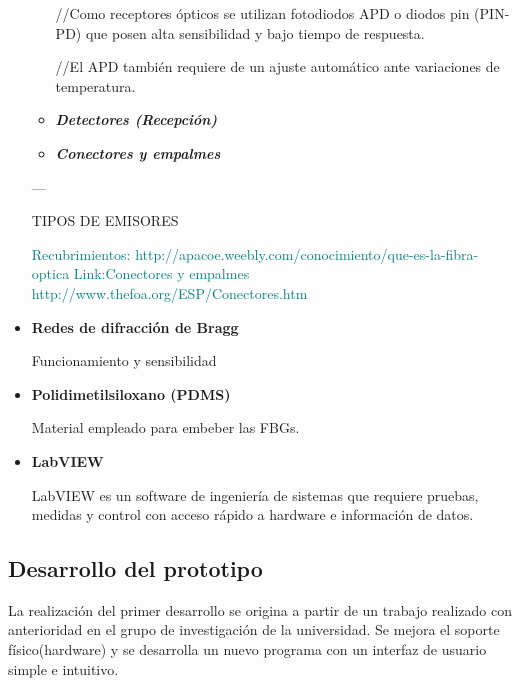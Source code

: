 \begin{itemize}
\begin{itemize}
 		//Como receptores ópticos se utilizan fotodiodos APD o diodos pin (PIN-PD) que posen alta sensibilidad y bajo tiempo de respuesta.
 		
 		//El APD también requiere de un ajuste automático ante variaciones de temperatura.
 		
 		
 		
 		\item \textit{\textbf{Detectores (Recepción)}}
 			
 			
 		\item \textit{\textbf{Conectores y empalmes}}
 		
 	 \end{itemize}					


---

TIPOS DE EMISORES


					


\textcolor{teal}{
	Recubrimientos: http://apacoe.weebly.com/conocimiento/que-es-la-fibra-optica
	Link:Conectores y empalmes
	http://www.thefoa.org/ESP/Conectores.htm
}

	\item \textbf{Redes de difracción de Bragg}
		
	Funcionamiento y sensibilidad
	
	\item \textbf{Polidimetilsiloxano (PDMS)}
		
	Material empleado para embeber las FBGs.
	
	\item \textbf{LabVIEW}
		
	LabVIEW es un software de ingeniería de sistemas que requiere pruebas, medidas y control con acceso rápido a hardware e información de datos. \cite{LabVIEWpage}





\end{itemize}
 
\subsection{Desarrollo del prototipo}
\label{sec:prot3FBG}

La realización del primer desarrollo se origina a partir de un trabajo realizado con anterioridad en el grupo de investigación de la universidad\cite{SilviaTFM}. Se mejora el soporte físico(hardware) y se desarrolla un nuevo programa con un interfaz de usuario simple e intuitivo.

